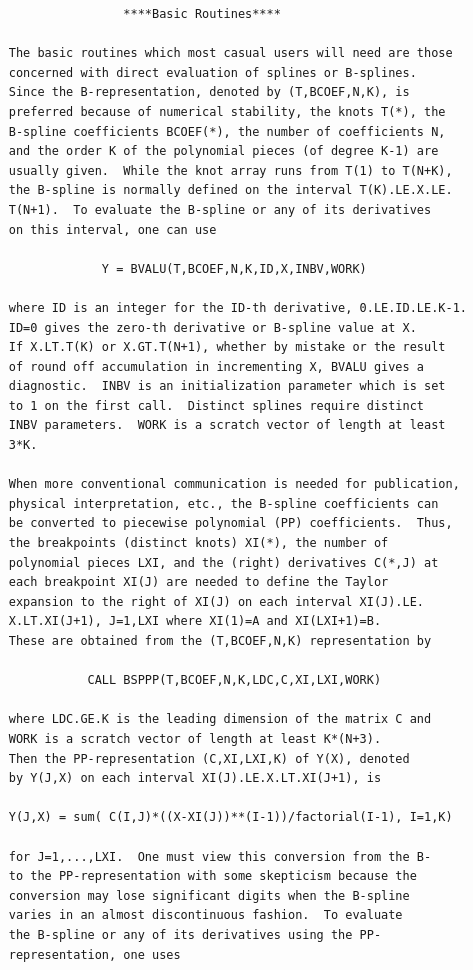 \documentclass[11pt,twoside]{article}
\begin{document}
\begin{verbatim}
                     ****Basic Routines****

     The basic routines which most casual users will need are those
     concerned with direct evaluation of splines or B-splines.
     Since the B-representation, denoted by (T,BCOEF,N,K), is
     preferred because of numerical stability, the knots T(*), the
     B-spline coefficients BCOEF(*), the number of coefficients N,
     and the order K of the polynomial pieces (of degree K-1) are
     usually given.  While the knot array runs from T(1) to T(N+K),
     the B-spline is normally defined on the interval T(K).LE.X.LE.
     T(N+1).  To evaluate the B-spline or any of its derivatives
     on this interval, one can use

                  Y = BVALU(T,BCOEF,N,K,ID,X,INBV,WORK)

     where ID is an integer for the ID-th derivative, 0.LE.ID.LE.K-1.
     ID=0 gives the zero-th derivative or B-spline value at X.
     If X.LT.T(K) or X.GT.T(N+1), whether by mistake or the result
     of round off accumulation in incrementing X, BVALU gives a
     diagnostic.  INBV is an initialization parameter which is set
     to 1 on the first call.  Distinct splines require distinct
     INBV parameters.  WORK is a scratch vector of length at least
     3*K.

     When more conventional communication is needed for publication,
     physical interpretation, etc., the B-spline coefficients can
     be converted to piecewise polynomial (PP) coefficients.  Thus,
     the breakpoints (distinct knots) XI(*), the number of
     polynomial pieces LXI, and the (right) derivatives C(*,J) at
     each breakpoint XI(J) are needed to define the Taylor
     expansion to the right of XI(J) on each interval XI(J).LE.
     X.LT.XI(J+1), J=1,LXI where XI(1)=A and XI(LXI+1)=B.
     These are obtained from the (T,BCOEF,N,K) representation by

                CALL BSPPP(T,BCOEF,N,K,LDC,C,XI,LXI,WORK)

     where LDC.GE.K is the leading dimension of the matrix C and
     WORK is a scratch vector of length at least K*(N+3).
     Then the PP-representation (C,XI,LXI,K) of Y(X), denoted
     by Y(J,X) on each interval XI(J).LE.X.LT.XI(J+1), is

     Y(J,X) = sum( C(I,J)*((X-XI(J))**(I-1))/factorial(I-1), I=1,K)

     for J=1,...,LXI.  One must view this conversion from the B-
     to the PP-representation with some skepticism because the
     conversion may lose significant digits when the B-spline
     varies in an almost discontinuous fashion.  To evaluate
     the B-spline or any of its derivatives using the PP-
     representation, one uses


\end{verbatim}
\end{document}
